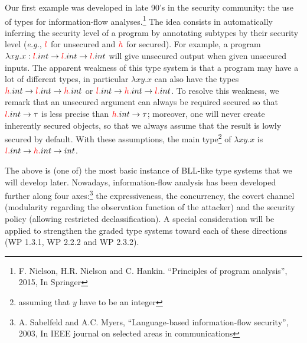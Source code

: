 \documentclass{article}[11pt]
\newcommand\rta{\rightarrow}
\begin{document}
Our first example was developed in late 90's in the security community: the use of types for information-flow analyses.\footnote{F. Nielson, H.R. Nielson and C. Hankin. ``Principles of program analysis'', 2015, In Springer} The idea consists in automatically inferring the security level of a program by annotating subtypes by their security level ({\em e.g.}, ${\color{red} l}$ for unsecured and ${\color{red}h}$ for secured). For example, a program $\lambda xy.x:{\color{red}l.}int\rta {\color{red}l.}int\rta {\color{red}l.}int$ will give unsecured output when given unsecured inputs. %
The apparent weakness of this type system is that a program may have a lot of different types, in particular $\lambda xy.x$ can also have the types ${\color{red}h}.int\rta {\color{red}l.}int\rta {\color{red}h.}int$ or ${\color{red}l.}int\rta {\color{red}h.}int\rta {\color{red}l.}int$. To resolve this weakness, we remark that an unsecured argument can always be required secured so that ${\color{red}l.}int\rta \tau$ is less precise than ${\color{red}h.}int\rta\tau$; moreover, one will never create inherently secured objects, so that we always assume that the result is lowly secured by default. With these assumptions, the main type\footnote{assuming that $y$ have to be an integer} of $\lambda xy.x$ is ${\color{red}l.}int\rta {\color{red}h.}int\rta int$.

The above is (one of) the most basic instance of BLL-like type systems that we will develop later. Nowadays, information-flow analysis has been developed further along four axes:\footnote{A. Sabelfeld and A.C. Myers, ``Language-based information-flow security'', 2003, In IEEE journal on selected areas in communications} the expressiveness, the concurrency, the covert channel (modularity regarding the observation function of the attacker) and the security policy (allowing restricted declassification). A special consideration will be applied to strengthen the graded type systems toward each of these directions (WP 1.3.1, WP 2.2.2 and WP 2.3.2).

\end{document}
